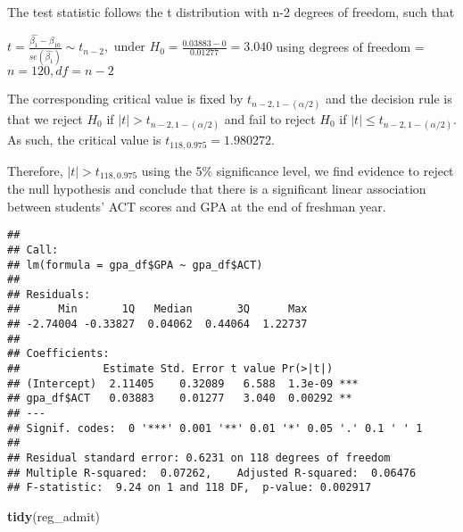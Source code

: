 \documentclass[
]{article}
\newenvironment{Shaded}{\begin{snugshade}}{\end{snugshade}}
\newcommand{\CommentTok}[1]{\textcolor[rgb]{0.56,0.35,0.01}{\textit{#1}}}
\newcommand{\KeywordTok}[1]{\textcolor[rgb]{0.13,0.29,0.53}{\textbf{#1}}}
\newcommand{\NormalTok}[1]{#1}
\newcommand{\OperatorTok}[1]{\textcolor[rgb]{0.81,0.36,0.00}{\textbf{#1}}}
\begin{document}
The test statistic follows the t distribution with n-2 degrees of
freedom, such that

\(t=\frac{\widehat{\beta_{1}}-\beta_{10}}{s e\left(\widehat{\beta_{1}}\right)} \sim t_{n-2}, \text { under } H_{0} = \frac{0.03883 - 0}{0.01277} = 3.040\)
using degrees of freedom = \(n = 120, df = n-2\)

The corresponding critical value is fixed by \(t_{n-2, 1-(\alpha/2)}\)
and the decision rule is that we reject \(H_0\) if
\(|t| > t_{n-2, 1-(\alpha/2)}\) and fail to reject \(H_0\) if
\(|t| \leq t_{n-2, 1-(\alpha/2)}\). As such, the critical value is
\(t_{118, 0.975} = 1.980272\).

Therefore, \(|t| > t_{118, 0.975}\) using the 5\% significance level, we
find evidence to reject the null hypothesis and conclude that there is a
significant linear association between students' ACT scores and GPA at
the end of freshman year.

\begin{Shaded}
\end{Shaded}

\begin{verbatim}
## 
## Call:
## lm(formula = gpa_df$GPA ~ gpa_df$ACT)
## 
## Residuals:
##      Min       1Q   Median       3Q      Max 
## -2.74004 -0.33827  0.04062  0.44064  1.22737 
## 
## Coefficients:
##             Estimate Std. Error t value Pr(>|t|)    
## (Intercept)  2.11405    0.32089   6.588  1.3e-09 ***
## gpa_df$ACT   0.03883    0.01277   3.040  0.00292 ** 
## ---
## Signif. codes:  0 '***' 0.001 '**' 0.01 '*' 0.05 '.' 0.1 ' ' 1
## 
## Residual standard error: 0.6231 on 118 degrees of freedom
## Multiple R-squared:  0.07262,    Adjusted R-squared:  0.06476 
## F-statistic:  9.24 on 1 and 118 DF,  p-value: 0.002917
\end{verbatim}

\begin{Shaded}
\begin{Highlighting}[]
\KeywordTok{tidy}\NormalTok{(reg_admit)}
\end{Highlighting}
\end{Shaded}
\end{document}
